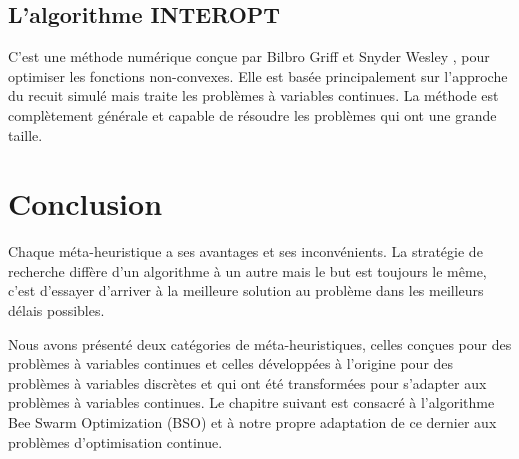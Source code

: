 \subsection{L'algorithme INTEROPT}
C'est une méthode numérique conçue par Bilbro Griff et Snyder Wesley  \cite{bilbro1991optimization}, pour optimiser les fonctions non-convexes. Elle est basée principalement sur l'approche du recuit simulé mais traite les problèmes à variables continues. La méthode est complètement générale et capable de résoudre les problèmes qui ont une grande taille.

\vspace{-1em}

\section*{Conclusion}
Chaque méta-heuristique a ses avantages et ses inconvénients. La stratégie de recherche diffère d'un algorithme à un autre mais le but est toujours le même, c'est d'essayer d'arriver à la meilleure solution au problème dans les meilleurs délais possibles.
 
Nous avons présenté deux catégories de méta-heuristiques, celles conçues pour des problèmes à variables continues et celles développées à l'origine pour des problèmes à variables discrètes et qui ont été transformées pour s'adapter aux problèmes à variables continues. Le chapitre suivant est consacré à l'algorithme Bee Swarm Optimization (BSO) et à notre propre adaptation de ce dernier aux problèmes d'optimisation continue.


